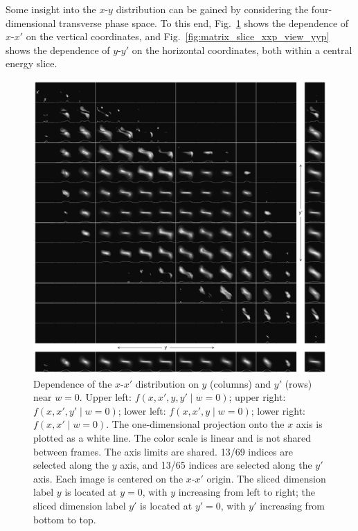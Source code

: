 \documentclass[%
 reprint,
nofootinbib,
 amsmath,amssymb,
 aps,
prstab,
]{revtex4-2}
\begin{document}
Some insight into the $x$-$y$ distribution can be gained by considering the four-dimensional transverse phase space. To this end, Fig.~\ref{fig:matrix_slice_yyp_view_xxp} shows the dependence of $x$-$x'$ on the vertical coordinates, and Fig.~\ref{fig:matrix_slice_xxp_view_yyp} shows the dependence of $y$-$y'$ on the horizontal coordinates, both within a central energy slice.
%
\begin{figure}[]
    \centering
    \includegraphics[width=\textwidth]{fig_matrix_slice_y-y'_view_x-x'.pdf}
    \caption{Dependence of the $x$-$x'$ distribution on $y$ (columns) and $y'$ (rows) near $w = 0$. Upper left: $f(x, x', y, y' \mid w{=}0)$; upper right: $f(x, x', y' \mid w{=}0)$; lower left: $f(x, x', y \mid w{=}0)$; lower right: $f(x, x' \mid w{=}0)$. The one-dimensional projection onto the $x$ axis is plotted as a white line. The color scale is linear and is not shared between frames. The axis limits are shared. 13/69 indices are selected along the $y$ axis, and 13/65 indices are selected along the $y'$ axis. Each image is centered on the $x$-$x'$ origin. The sliced dimension label $y$ is located at $y = 0$, with $y$ increasing from left to right; the sliced dimension label $y'$ is located at $y' = 0$, with $y'$ increasing from bottom to top.}
    \label{fig:matrix_slice_yyp_view_xxp}
\end{figure}
\end{document}
